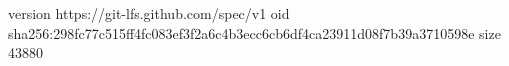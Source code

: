 version https://git-lfs.github.com/spec/v1
oid sha256:298fc77c515ff4fc083ef3f2a6c4b3ecc6cb6df4ca23911d08f7b39a3710598e
size 43880
